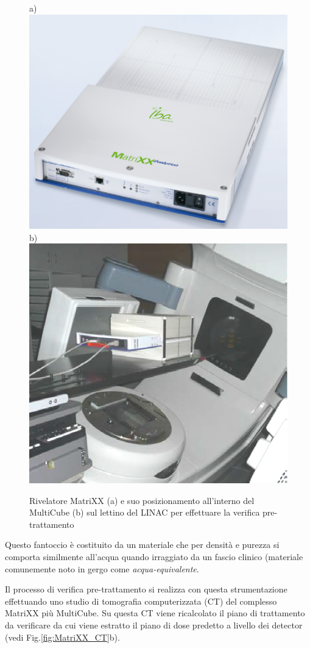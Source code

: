 \begin{figure}
\centering
a)\includegraphics[width=.45\textwidth]{./cap2/MatriXX_Alone.png}
b)\includegraphics[width=.45\textwidth]{./cap2/MatriXX_Cube.png}
\caption{Rivelatore MatriXX (a) e suo posizionamento all'interno del MultiCube (b) sul lettino del LINAC per effettuare la verifica pre-trattamento}
\label{fig:MatriXX}
\end{figure}
Questo fantoccio è costituito da un materiale che per densità e purezza si comporta similmente all'acqua quando irraggiato da un fascio clinico (materiale comunemente noto in gergo come \textit{acqua-equivalente}. 

Il processo di verifica pre-trattamento si realizza con questa strumentazione effettuando uno studio di tomografia computerizzata (CT) del complesso MatriXX più MultiCube. Su questa CT viene ricalcolato il piano di trattamento da verificare da cui viene estratto il piano di dose predetto a livello dei detector (vedi Fig.\ref{fig:MatriXX_CT}b).

